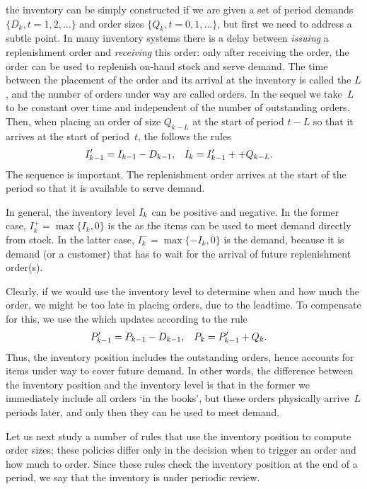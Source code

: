 \documentclass[stochastic-or.tex]{subfiles}
\begin{document}
 the inventory can be simply constructed if we are given a set of period demands $\{D_k, t=1, 2, \ldots\}$ and order sizes $\{Q_k, t=0, 1, \ldots\}$, but first we need to address a subtle point.
In many inventory systems there is a delay between \emph{issuing} a replenishment order and \emph{receiving} this order:  only after receiving the order, the order can be used to replenish on-hand stock and serve demand.  The time between the placement of the order and its arrival at the inventory is called the  $L$, and the number of orders under way are called  orders. In the sequel we take~$L$ to be constant over time and independent of the number of outstanding orders.
Then, when placing an order of size $Q_{k-L}$ at the start of period $t-L$ so that it arrives at the start of period~$t$,  the   follows  the rules
\begin{align}\label{eq:i5}
 I_{k-1}' &= I_{k-1} - D_{k-1},  & I_{k} &= I_{k-1}' + +Q_{k-L}.
\end{align}
The sequence is important. The replenishment order arrives at the start of the period so that it is available to serve demand.

In general, the inventory level $I_k$ can be positive and negative.
In the former case, $I_k^{+} = \max\{I_k,0\}$ is the  as the items can be used to meet demand directly from stock.
In the latter case, $I^{-}_k = \max\{-I_k, 0\}$ is the  demand, because it is demand (or a customer) that has to wait for the arrival of future replenishment order(s).

Clearly, if we would use the inventory level to determine when and how much the order, we might be too late in placing orders, due to the leadtime. To compensate for this, we use the   which updates according to the rule
\begin{align}\label{eq:b9}
P_{k-1}' &= P_{k-1}- D_{k-1},  &  P_k &= P_{k-1}' + Q_k.
\end{align}
Thus, the inventory position includes the outstanding orders, hence accounts for items under way to cover future demand.
In other words, the difference between the inventory position and the inventory level is that in the former we immediately include all orders `in the books', but these orders physically arrive~$L$ periods later, and only then they can be used to meet demand.


Let us next study a number of rules that use the inventory position to compute order sizes; these policies differ only in the decision when to trigger an order and how much to order. Since these rules check the inventory position at the end of a period, we say that the inventory is under periodic review.
\end{document}
